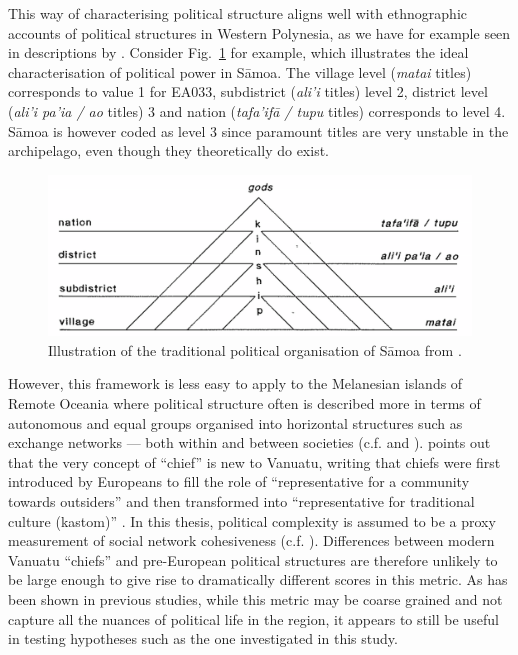 \documentclass[a4paper,10pt]{article} %
\begin{document}
This way of characterising political structure aligns well with ethnographic accounts of political structures in Western Polynesia, as we have for example seen in descriptions by \citet{sahlins63}. Consider Fig.~\ref{meleiseapyramid} \citep[22]{meleisea1995} for example, which illustrates the ideal characterisation of political power in S\={a}moa. The village level (\emph{matai} titles) corresponds to value 1 for EA033, subdistrict (\emph{ali'i} titles) level 2, district level (\emph{ali'i pa'ia / ao} titles) 3 and nation (\emph{tafa'if\={a} / tupu} titles) corresponds to level 4. S\={a}moa is however coded as level 3 since paramount titles are very unstable in the archipelago, even though they theoretically do exist.


\begin{figure}[ht]
\centering
\includegraphics[width=13cm]{pyramid_meleisea.png}
\caption[Illustration of traditional political organisation of S\={a}moa.]{{Illustration of the traditional political organisation of S\={a}moa from \citet[22]{meleisea1995}.}}
\label{meleiseapyramid}
\end{figure}

However, this framework is less easy to apply to the Melanesian islands of Remote Oceania where political structure often is described more in terms of autonomous and equal groups organised into horizontal structures such as exchange networks --- both within and between societies (c.f. \citet{bonnemaison1996graded} and \citet{huffman1996trading}). \citet{bolton1998chief} points out that the very concept of ``chief'' is new to Vanuatu, writing that chiefs were first introduced by Europeans to fill the role of ``representative for a community towards outsiders'' and then transformed into ``representative for traditional culture (kastom)'' \citep[185]{bolton1998chief}. In this thesis, political complexity is assumed to be a proxy measurement of social network cohesiveness (c.f. \citet{grace_1992_aberrant}). Differences between modern Vanuatu ``chiefs'' and pre-European political structures are therefore unlikely to be large enough to give rise to dramatically different scores in this metric. As has been shown in previous studies, while this metric may be coarse grained and not capture all the nuances of political life in the region, it appears to still be useful in testing hypotheses such as the one investigated in this study.
\end{document}

